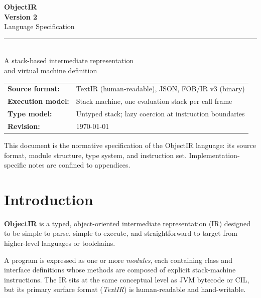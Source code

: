 \documentclass[11pt,a4paper]{article}
\begin{document}
\begin{titlepage}
  \centering
  \vspace*{3cm}
  {\Huge\bfseries ObjectIR}\\[0.5em]
  {\large\bfseries Version 2}\\[0.8em]
  {\Large Language Specification}\\[2.5em]
  \rule{0.55\linewidth}{0.4pt}\\[1.2em]
  {\normalsize
    A stack-based intermediate representation\\[0.3em]
    and virtual machine definition
  }\\[2.5em]
  \begin{tabular}{ll}
    \textbf{Source format:}   & TextIR (human-readable), JSON, FOB/IR v3 (binary) \\[0.2em]
    \textbf{Execution model:} & Stack machine, one evaluation stack per call frame \\[0.2em]
    \textbf{Type model:}      & Untyped stack; lazy coercion at instruction boundaries \\[0.2em]
    \textbf{Revision:}        & \today \\
  \end{tabular}
  \vfill
  {\small This document is the normative specification of the ObjectIR language:
  its source format, module structure, type system, and instruction set.
  Implementation-specific notes are confined to appendices.}
\end{titlepage}

\tableofcontents
\newpage

\section{Introduction}

\textbf{ObjectIR} is a typed, object-oriented intermediate representation (IR)
designed to be simple to parse, simple to execute, and straightforward to
target from higher-level languages or toolchains.

A program is expressed as one or more \emph{modules}, each containing class
and interface definitions whose methods are composed of explicit stack-machine
instructions. The IR sits at the same conceptual level as JVM bytecode or
CIL, but its primary surface format (\emph{TextIR}) is human-readable and
hand-writable.
\end{document}
